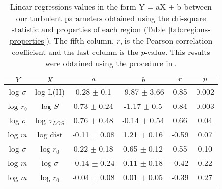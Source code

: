 \begin{table*}
\begin{center}
\caption{Linear regressions values in the form Y = aX + b between our turbulent parameters obtained using the chi-square statistic and properties of each region (Table \ref{tab:regions-properties}). The fifth column, $r$, is the Pearson correlation coefficient and the last column is the $p$-value. This results were obtained using the procedure in \citet{2007ApJ...665.1489K}.}
\begin{tabular}{cccccc}
\hline
            $Y$ &                   $X$ &                 $a$ &                 $b$ &       $r$ &      $p$ \\
\hline
 log $\sigma$ &            log L(H) &   0.28 $\pm$ 0.1 &  -9.87 $\pm$ 3.66 &   0.85 &  0.002 \\
    log $r_0$ &             log $S$ &   0.73 $\pm$ 0.24 &  -1.17 $\pm$ 0.5 &   0.84 &  0.003 \\
 log $\sigma$ &  log $\sigma_{LOS}$ &   0.76 $\pm$ 0.48 &  -0.14 $\pm$ 0.54 &   0.66 &   0.04 \\
      log $m$ &            log dist &  -0.11 $\pm$ 0.08 &   1.21 $\pm$ 0.16 &  -0.59 &   0.07 \\
 log $\sigma$ &         log $r_{0}$ &   0.22 $\pm$ 0.18 &   0.65 $\pm$ 0.12 &   0.55 &  0.10 \\
      log $m$ &        log $\sigma$ &  -0.14 $\pm$ 0.24 &   0.11 $\pm$ 0.18 &  -0.42 &  0.22 \\
      log $m$ &         log $r_{0}$ &  -0.04 $\pm$ 0.08 &   0.01 $\pm$ 0.05 &  -0.39 &   0.27 \\
\bottomrule
\end{tabular}\label{tab:RestStats}
\end{center}
\end{table*}


